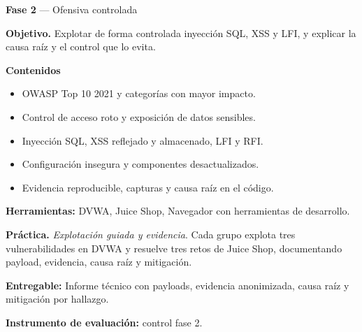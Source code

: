 \documentclass[11pt,a4paper]{article}
\begin{document}
\begin{tcolorbox}[cajaContenido,title={Semana 5 --- Vulnerabilidades web según OWASP Top 10}]
\textbf{Fase 2} --- Ofensiva controlada

\textbf{Objetivo.} Explotar de forma controlada inyección SQL, XSS y LFI, y explicar la causa raíz y el control que lo evita.

\textbf{Contenidos}

\begin{itemize}[leftmargin=1.4em,itemsep=2pt,topsep=3pt]
  \item OWASP Top 10 2021 y categorías con mayor impacto.
  \item Control de acceso roto y exposición de datos sensibles.
  \item Inyección SQL, XSS reflejado y almacenado, LFI y RFI.
  \item Configuración insegura y componentes desactualizados.
  \item Evidencia reproducible, capturas y causa raíz en el código.
\end{itemize}

\textbf{Herramientas:} DVWA, Juice Shop, Navegador con herramientas de desarrollo.

\textbf{Práctica.} \emph{Explotación guiada y evidencia}. Cada grupo explota tres vulnerabilidades en DVWA y resuelve tres retos de Juice Shop, documentando payload, evidencia, causa raíz y mitigación.


\textbf{Entregable:} Informe técnico con payloads, evidencia anonimizada, causa raíz y mitigación por hallazgo.

\textbf{Instrumento de evaluación:} control fase 2.
\end{tcolorbox}
\end{document}
